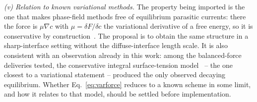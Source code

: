 \documentclass[preprint,3p,11pt]{elsarticle}
\begin{document}
\emph{(v) Relation to known variational methods.} The property being imported is the one
that makes phase-field methods free of equilibrium parasitic currents: there the force is
$\mu\nabla c$ with $\mu=\delta F/\delta c$ the variational derivative of a free energy, so
it is conservative by construction~\cite{jacqmin1999}. The proposal is to obtain the same
structure in a sharp-interface setting without the diffuse-interface length scale. It is
also consistent with an observation already in this work: among the balanced-force
deliveries tested, the conservative integral surface-tension
model~\cite{abualsaud2018} -- the one closest to a variational statement -- produced the only
observed decaying equilibrium. Whether Eq.~\eqref{eq:varforce} reduces to a known scheme in
some limit, and how it relates to that model, should be settled before implementation.
\end{document}
